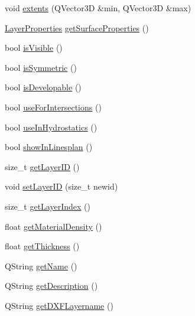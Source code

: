\begin{DoxyCompactItemize}
\item 
void \hyperlink{classShipCAD_1_1SubdivisionLayer_a2fc3ac326021a97479b821331e295640}{extents} (Q\-Vector3\-D \&min, Q\-Vector3\-D \&max)
\item 
\hyperlink{structShipCAD_1_1LayerProperties}{Layer\-Properties} \hyperlink{classShipCAD_1_1SubdivisionLayer_a7d42f81a94b46f0d999a4fa7a48d57d6}{get\-Surface\-Properties} ()
\item 
bool \hyperlink{classShipCAD_1_1SubdivisionLayer_afa4ea10cf2e982c9d8dc179feb15a400}{is\-Visible} ()
\item 
bool \hyperlink{classShipCAD_1_1SubdivisionLayer_a4cc4c42849feacc4a7af21ce90e2541b}{is\-Symmetric} ()
\item 
bool \hyperlink{classShipCAD_1_1SubdivisionLayer_ad1907e05d0f60e9d7f401231198217d2}{is\-Developable} ()
\item 
bool \hyperlink{classShipCAD_1_1SubdivisionLayer_a817b83f4da64e030609d77c4984d7fb1}{use\-For\-Intersections} ()
\item 
bool \hyperlink{classShipCAD_1_1SubdivisionLayer_ab80cd9444086290d1298b9b2459a9e7b}{use\-In\-Hydrostatics} ()
\item 
bool \hyperlink{classShipCAD_1_1SubdivisionLayer_a049e7c5ca442f4b02cdad9935d999e1b}{show\-In\-Linesplan} ()
\item 
size\-\_\-t \hyperlink{classShipCAD_1_1SubdivisionLayer_a29642f60a1b67df1a42c16a6bf3b97e9}{get\-Layer\-I\-D} ()
\item 
void \hyperlink{classShipCAD_1_1SubdivisionLayer_ad6cbb87ecaadd6c31635fb86fe1a4b13}{set\-Layer\-I\-D} (size\-\_\-t newid)
\item 
size\-\_\-t \hyperlink{classShipCAD_1_1SubdivisionLayer_a9a760dcc67779d111d5e05585e939138}{get\-Layer\-Index} ()
\item 
float \hyperlink{classShipCAD_1_1SubdivisionLayer_af65aafc08837eb47eefad5fbbd562d32}{get\-Material\-Density} ()
\item 
float \hyperlink{classShipCAD_1_1SubdivisionLayer_a4d26f33298b7d44d41f3e3ee87a2d981}{get\-Thickness} ()
\item 
Q\-String \hyperlink{classShipCAD_1_1SubdivisionLayer_affb4df074a7f116ce60f51ad7b7ba230}{get\-Name} ()
\item 
Q\-String \hyperlink{classShipCAD_1_1SubdivisionLayer_acb442d69e4dcf6e09b5019b6416d2d58}{get\-Description} ()
\item 
Q\-String \hyperlink{classShipCAD_1_1SubdivisionLayer_a46633012876a7e13fac9ed9d7f262136}{get\-D\-X\-F\-Layername} ()
\item 

\end{DoxyCompactItemize}
